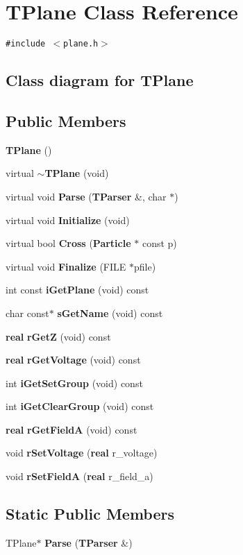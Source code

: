 \section{TPlane  Class Reference}
\label{TPlane}


{\tt \#include $<$plane.h$>$}

\subsection*{Class diagram for TPlane}
\begin{figure}[H]
\begin{center}
\leavevmode
\setlength{\epsfysize}{3cm}
\end{center}
\end{figure}
\subsection*{Public Members}
\begin{CompactItemize}
\item 
{\bf TPlane} ()
\item 
virtual {\bf $\sim$TPlane} (void)
\item 
virtual void {\bf Parse} ({\bf TParser} \&, char $\ast$)
\item 
virtual void {\bf Initialize} (void)
\item 
virtual bool {\bf Cross} ({\bf Particle} $\ast$ const p)
\item 
virtual void {\bf Finalize} (FILE $\ast$pfile)
\item 
int const {\bf i\-Get\-Plane} (void) const
\item 
char const$\ast$ {\bf s\-Get\-Name} (void) const
\item 
{\bf real} {\bf r\-Get\-Z} (void) const
\item 
{\bf real} {\bf r\-Get\-Voltage} (void) const
\item 
int {\bf i\-Get\-Set\-Group} (void) const
\item 
int {\bf i\-Get\-Clear\-Group} (void) const
\item 
{\bf real} {\bf r\-Get\-Field\-A} (void) const
\item 
void {\bf r\-Set\-Voltage} ({\bf real} r\_\-voltage)
\item 
void {\bf r\-Set\-Field\-A} ({\bf real} r\_\-field\_\-a)
\end{CompactItemize}
\subsection*{Static Public Members}
\begin{CompactItemize}
\item 
TPlane$\ast$ {\bf Parse} ({\bf TParser} \&)
\end{CompactItemize}
